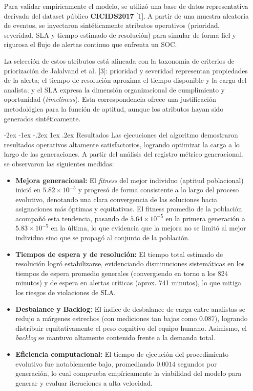 \documentclass[12pt,a4paper,twocolumn]{article}
\makeatletter
\renewcommand{\section}{\@startsection{section}{1}{\z@}%
  {-2ex \@plus -1ex \@minus -.2ex}%
  {1ex \@plus.2ex}%
  {\fontsize{12}{14}\selectfont\bfseries}}
\makeatother
\begin{document}
Para validar empíricamente el modelo, se utilizó una base de datos representativa derivada del dataset público \textbf{CICIDS2017} [1]. A partir de una muestra aleatoria de eventos, se inyectaron sintéticamente atributos operativos (prioridad, severidad, SLA y tiempo estimado de resolución) para simular de forma fiel y rigurosa el flujo de alertas continuo que enfrenta un SOC.

La selección de estos atributos está alineada con la taxonomía de criterios de priorización de Jalalvand et al. [3]: prioridad y severidad representan propiedades de la alerta; el tiempo de resolución aproxima el tiempo disponible y la carga del analista; y el SLA expresa la dimensión organizacional de cumplimiento y oportunidad (\textit{timeliness}). Esta correspondencia ofrece una justificación metodológica para la función de aptitud, aunque los atributos hayan sido generados sintéticamente.

\section{Resultados}
Las ejecuciones del algoritmo demostraron resultados operativos altamente satisfactorios, logrando optimizar la carga a lo largo de las generaciones. A partir del análisis del registro métrico generacional, se observaron las siguientes medidas:

\begin{itemize}
    \item \textbf{Mejora generacional:} El \textit{fitness} del mejor individuo (aptitud poblacional) inició en $5.82\times 10^{-5}$ y progresó de forma consistente a lo largo del proceso evolutivo, denotando una clara convergencia de las soluciones hacia asignaciones más óptimas y equitativas. El fitness promedio de la población acompañó esta tendencia, pasando de $5.64\times 10^{-5}$ en la primera generación a $5.83\times 10^{-5}$ en la última, lo que evidencia que la mejora no se limitó al mejor individuo sino que se propagó al conjunto de la población.
    \item \textbf{Tiempos de espera y de resolución:} El tiempo total estimado de resolución logró estabilizarse, evidenciando disminuciones sistemáticas en los tiempos de espera promedio generales (convergiendo en torno a los 824 minutos) y de espera en alertas críticas (aprox. 741 minutos), lo que mitiga los riesgos de violaciones de SLA.
    \item \textbf{Desbalance y Backlog:} El índice de desbalance de carga entre analistas se redujo a márgenes estrechos (con mediciones tan bajas como $0.087$), logrando distribuir equitativamente el peso cognitivo del equipo humano. Asimismo, el \textit{backlog} se mantuvo altamente contenido frente a la demanda total.
    \item \textbf{Eficiencia computacional:} El tiempo de ejecución del procedimiento evolutivo fue notablemente bajo, promediando $0.0014$ segundos por generación, lo cual comprueba empíricamente la viabilidad del modelo para generar y evaluar iteraciones a alta velocidad.
\end{itemize}
\end{document}
